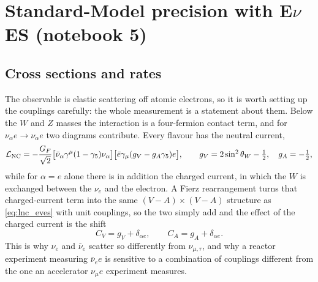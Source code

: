 \documentclass[aps,prd,superscriptaddress,nofootinbib,longbibliography,notitlepage,11pt]{revtex4-2}
\newcommand{\eves}{E$\nu$ES}
\newcommand{\sw}{\sin^2\theta_W}
\begin{document}
\section{Standard-Model precision with \eves{} (notebook 5)}
\label{sec:sm}

\subsection{Cross sections and rates}
The observable is elastic scattering off atomic electrons, so it is worth setting up the
couplings carefully: the whole measurement is a statement about them.  Below the $W$ and
$Z$ masses the interaction is a four-fermion contact term, and for
$\nu_\alpha e\to\nu_\alpha e$ two diagrams contribute.  Every flavour has the neutral
current,
\begin{equation}
\mathcal{L}_{\rm NC}=-\frac{G_F}{\sqrt2}
\big[\bar\nu_\alpha\gamma^\mu(1-\gamma_5)\nu_\alpha\big]
\big[\bar e\gamma_\mu(g_V-g_A\gamma_5)e\big],
\qquad g_V=2\sw-\tfrac12,\quad g_A=-\tfrac12 ,
\label{eq:lnc_eves}
\end{equation}
while for $\alpha=e$ alone there is in addition the charged current, in which the
$W$ is exchanged between the $\nu_e$ and the electron.  A Fierz rearrangement turns that
charged-current term into the same $(V-A)\times(V-A)$ structure as \cref{eq:lnc_eves} with
unit couplings, so the two simply add and the effect of the charged current is the shift
\begin{equation}
C_V=g_V+\delta_{\alpha e},\qquad C_A=g_A+\delta_{\alpha e} .
\label{eq:cvca}
\end{equation}
This is why $\nu_e$ and $\bar\nu_e$ scatter so differently from $\nu_{\mu,\tau}$, and why a
reactor experiment measuring $\bar\nu_e e$ is sensitive to a combination of couplings
different from the one an accelerator $\nu_\mu e$ experiment measures.
\end{document}
